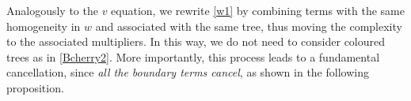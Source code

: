 \documentclass[%
11pt,  reqno]{amsart}
\makeatletter
\newcommand{\5}{\textup{V}}
\newcommand{\noi}{\noindent}
\newcommand{\ind}{\mathbbm 1}
\theoremstyle{remark}
\newcommand{\TT}{\mathcal{T}}
\newcommand{\G}{\Gamma}
\DeclareMathOperator{\mulB}{mul_{\BB}}
\def\<#1>{\csname MH@symb@#1\endcsname}
\def\distC{15}
\newcommand{\cherry}[3]{
	\begin{tikzpicture}[
		baseline=-8, scale=0.6, every node/.style={dotA},
		level distance=15pt,
		level 1/.style={sibling distance=\distC pt}
		]
		\node  [label=above:{$#1$}]  (root) {}
		child
		child
		;
		\node [label= left:{$#2$}]  at (root-1) {};
		\node [label= right:{$#3$}] at (root-2) {};
	\end{tikzpicture}
}
\newcommand{\B}{\mathcal{B}}
\numberwithin{equation}{section}
\numberwithin{theorem}{section}
\newcommand{\BB}{\mathrm{B}}
\newcommand{\D}{\mathrm{D}}
\makeatother
\begin{document}
\noi Analogously to the $v$ equation, we rewrite \eqref{w1} by combining terms with the same homogeneity in $w$ and associated with the same tree, thus moving the complexity to the associated multipliers. In this way, we do not need to consider coloured trees as in \eqref{Bcherry2}. More importantly, this process leads to a fundamental cancellation, since \textit{all the boundary terms cancel}, as shown in the following proposition.



\end{document}
